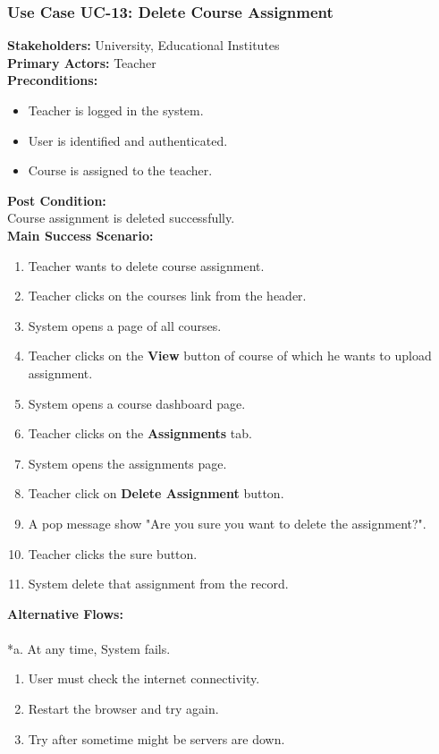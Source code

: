 \documentclass[12pt]{article}
\begin{document}
\subsubsection{Use Case UC-13: Delete Course Assignment}
\textbf{Stakeholders: } University, Educational Institutes \\
\textbf{Primary Actors: }Teacher \\
\textbf{Preconditions:}
\begin{itemize}
\item Teacher is logged in the system.
\item User is identified and authenticated.
\item Course is assigned to the teacher.
\end{itemize}
\textbf{Post Condition: }\\
Course assignment is deleted successfully.\\
\textbf{Main Success Scenario:}
\begin{enumerate}
\item Teacher wants to delete course assignment.
\item Teacher clicks on the courses link from the header.
\item System opens a page of all courses.
\item Teacher clicks on the \textbf{View} button of course of which he wants to upload assignment.
\item System opens a course dashboard page.
\item Teacher clicks on the \textbf{Assignments} tab.
\item System opens the assignments page.
\item Teacher click on \textbf{Delete Assignment} button.
\item A pop message show "Are you sure you want to delete the assignment?".
\item Teacher clicks the sure button.
\item System delete that assignment from the record.
\end{enumerate}
\textbf{Alternative Flows:}\\
\\
*a. At any time, System fails.
\begin{enumerate}
\item User must check the internet connectivity.
\item Restart the browser and try again.
\item Try after sometime might be servers are down.
\end{enumerate}
\end{document}
